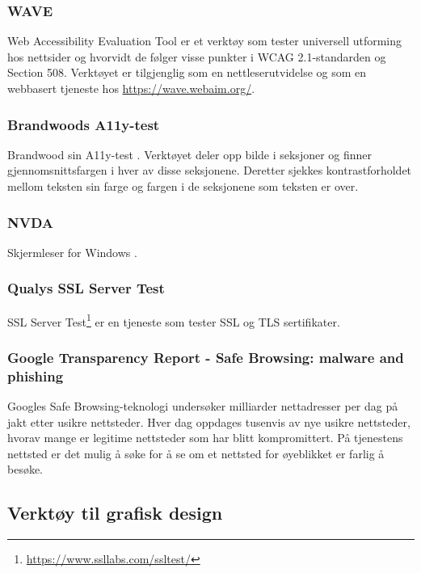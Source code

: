 \subsubsection{WAVE}
\label{sec:wave}
Web Accessibility Evaluation Tool \cite{webaim2018wh} er et verktøy som tester universell utforming hos nettsider og hvorvidt de følger visse punkter i WCAG 2.1-standarden og Section 508. Verktøyet er tilgjenglig som en nettleserutvidelse og som en webbasert tjeneste hos \url{https://wave.webaim.org/}.

\subsubsection{Brandwoods A11y-test} 
\label{sec:brandwoods-a11y-test}
Brandwood sin A11y-test \cite{sl2009sst}. Verktøyet deler opp bilde i seksjoner og finner gjennomsnittsfargen i hver av disse seksjonene. Deretter sjekkes kontrastforholdet mellom teksten sin farge og fargen i de seksjonene som teksten er over.

\subsubsection{NVDA}
\label{sec:analysis-tools-nvda}
Skjermleser for Windows \cite{nvda}.

\subsubsection{Qualys SSL Server Test}
\label{sec:qualys-ssl-server-test}
SSL Server Test\footnote{\url{https://www.ssllabs.com/ssltest/}} er en tjeneste som tester SSL og TLS sertifikater. 

\subsubsection{Google Transparency Report - Safe Browsing: malware and phishing}
\label{sec:google-transparency-report}
Googles Safe Browsing-teknologi \cite{google2019sbs} undersøker milliarder nettadresser per dag på jakt etter usikre nettsteder. Hver dag oppdages tusenvis av nye usikre nettsteder, hvorav mange er legitime nettsteder som har blitt kompromittert. På tjenestens nettsted er det mulig å søke for å se om et nettsted for øyeblikket er farlig å besøke.

\subsection{Verktøy til grafisk design}

